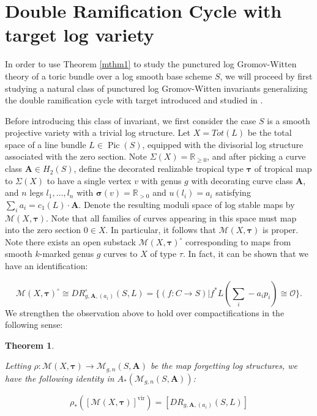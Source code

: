 \documentclass[12pt, oneside]{amsart}   	%
\newcounter{thm}
\newtheorem{theorem}[thm]{Theorem}
\newcommand{\vir}{\operatorname{vir}}
\newcommand{\Pic}{\operatorname{Pic}}
\numberwithin{equation}{section}
\numberwithin{thm}{section}
\numberwithin{figure}{section}
\begin{document}
 
 
 



\section{Double Ramification Cycle with target log variety}
In order to use Theorem \ref{mthm1} to study the punctured log Gromov-Witten theory of a toric bundle over a log smooth base scheme $S$, we will proceed by first studying a natural class of punctured log Gromov-Witten invariants generalizing the double ramification cycle with target introduced and studied in \cite{DRtarget}. 

Before introducing this class of invariant, we first consider the case $S$ is a smooth projective variety with a trivial log structure. Let $X =Tot(L)$ be the total space of a line bundle $L \in \Pic(S)$, equipped with the divisorial log structure associated with the zero section. Note $\Sigma(X) = \mathbb{R}_{\ge 0}$, and after picking a curve class $\textbf{A} \in H_2(S)$, define the decorated realizable tropical type $\pmb\tau$ of tropical map to $\Sigma(X)$ to have a single vertex $v$ with genus $g$ with decorating curve class $\textbf{A}$, and $n$ legs $l_1,\ldots,l_n$ with $\pmb\sigma(v) = \mathbb{R}_{> 0}$ and $u(l_i) = a_i$ satisfying $\sum_i a_i = c_1(L)\cdot \textbf{A}$. Denote the resulting moduli space of log stable maps by $\mathscr{M}(X,\pmb\tau)$. Note that all families of curves appearing in this space must map into the zero section $0 \in X$. In particular, it follows that $\mathscr{M}(X,\pmb\tau)$ is proper. Note there exists an open substack $\mathscr{M}(X,\pmb\tau)^\circ$ corresponding to maps from smooth $k$-marked genus $g$ curves to $X$ of type $\tau$. In fact, it can be shown that we have an identification:

\[\mathscr{M}(X,\pmb\tau)^\circ \cong DR^\circ_{g,\textbf{A},(a_i)}(S,L) = \{(f:C \rightarrow S)| f^*L(\sum_i -a_ip_i) \cong \mathcal{O}\}.\]
We strengthen the observation above to hold over compactifications in the following sense:

\begin{theorem}\label{punctorub}


Letting $\rho: \mathscr{M}(X,\pmb\tau) \rightarrow \mathscr{M}_{g,n}(S,\textbf{A})$ be the map forgetting log structures, we have the following identity in $A_*(\mathscr{M}_{g,n}(S,\textbf{A}))$:

\[\rho_*([\mathscr{M}(X,\pmb\tau)]^{\vir}) = [DR_{g,\textbf{A},(a_i)}(S,L)]\]

\end{theorem}
\end{document}
